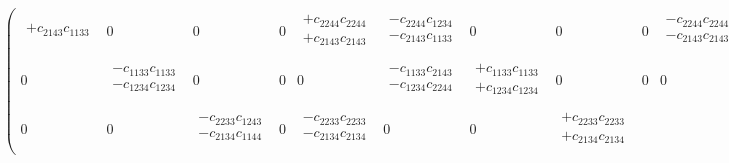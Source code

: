 \begin{eqnarray}
\begin{pmatrix}
\begin{array}{l}
+c_{2143}c_{1133} \\
\end{array} &
0 &
0 &
0 &
\begin{array}{l}
+c_{2244}c_{2244} \\
+c_{2143}c_{2143} \\
\end{array} &
\begin{array}{l}
-c_{2244}c_{1234} \\
-c_{2143}c_{1133} \\
\end{array} &
0 &
0 &
0 &
\begin{array}{l}
-c_{2244}c_{2244} \\
-c_{2143}c_{2143} \\
\end{array} &
0 \\
0 &
\begin{array}{l}
-c_{1133}c_{1133} \\
-c_{1234}c_{1234} \\
\end{array} &
0 &
0 &
0 &
\begin{array}{l}
-c_{1133}c_{2143} \\
-c_{1234}c_{2244} \\
\end{array} &
\begin{array}{l}
+c_{1133}c_{1133} \\
+c_{1234}c_{1234} \\
\end{array} &
0 &
0 &
0 &
\begin{array}{l}
+c_{1133}c_{2143} \\
+c_{1234}c_{2244} \\
\end{array} &
0 \\
0 &
0 &
\begin{array}{l}
-c_{2233}c_{1243} \\
-c_{2134}c_{1144} \\
\end{array} &
0 &
\begin{array}{l}
-c_{2233}c_{2233} \\
-c_{2134}c_{2134} \\
\end{array} &
0 &
0 &
\begin{array}{l}
+c_{2233}c_{2233} \\
+c_{2134}c_{2134} \\
\end{array} &

\end{pmatrix}
\end{eqnarray}
